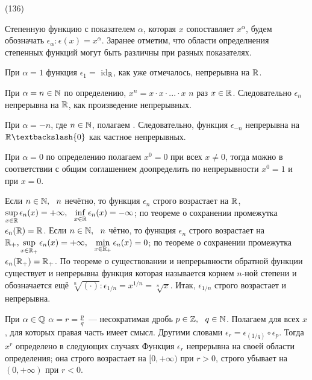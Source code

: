(136)

Степенную функцию с показателем $\alpha$, которая $x$ сопоставляет $x^\alpha$, будем обозначать $\epsilon_\alpha: \epsilon(x) = x^\alpha$. Заранее отметим, что области определнения степенных функций могут быть различны при разных показателях.

При $\alpha = 1$ функция $\epsilon_1 =$ id$_{\mathbb{R}}$, как уже отмечалось, непрерывна на $\mathbb{R}$.

При $\alpha = n\in\mathbb{N}$ по определению, $x^n = x\cdot x\cdot ... \cdot x$ $n$ раз $x \in \mathbb{R}$. Следовательно $\epsilon_n$непрерывна на $\mathbb{R}$, как произведение непрерывных.

При $\alpha = -n$, где $n \in \mathbb{N}$, полагаем . Следовательно, функция $\epsilon_{-n}$ непрерывна на $\R\bsl \{0\}$ как частное непрерывных.

При $\alpha = 0$ по определению полагаем $x^0 = 0$ при всех $x \neq 0$, тогда можно в соответствии с общим соглашением доопределить  по непрерывности $x^0 = 1$ и при $x = 0$.

Если $n \in \mathbb{N},\ \  n$ нечётно, то функция $\epsilon_n$ строго возрастает на $\mathbb{R}$, $\displaystyle \sup\limits^{}_{x \in \mathbb{R}} \epsilon_n(x) = +\infty,\ \  \displaystyle \inf\limits^{}_{x \in \mathbb{R}} \epsilon_n(x) = -\infty$; по теореме о сохранении промежутка $\epsilon_n(\mathbb{R}) = \mathbb{R}$. Если $n \in \mathbb{N},\ \  n$ чётно, то функция $\epsilon_n$ строго возрастает на $\mathbb{R}_+, \displaystyle \sup\limits^{}_{x\in \mathbb{R}_+} \epsilon_n(x) = +\infty,\ \  \displaystyle \min\limits^{}_{x \in \mathbb{R}_+} \epsilon_n(x) = 0$; по теореме о сохранении промежутка $\epsilon_n(\mathbb{R}_+) = \mathbb{R}_+$. По теореме о существовании и непрерывности обратной функции существует и непрерывна функция  которая называется корнем $n$-ной степени и обозначается ещё $\sqrt[n]{(\cdot)}: \epsilon_{1/n} = x^{1/n} = \sqrt[n]{x}$. Итак,   $\epsilon_{1/n}$ строго возрастает и непрерывна.

При $\alpha \in \mathbb{Q}$ $\alpha = r = \frac pq$~--- несократимая дробь $p \in \mathbb{Z},\ \  q \in \mathbb{N}$. Полагаем  для всех $x$, для которых правая часть имеет смысл. Другими словами $\epsilon_r = \epsilon_(1/q) \circ \epsilon_p$. Тогда $x^r$ определено в следующих случаях    Функция $\epsilon_r$ непрерывна на своей области определения; она строго возрастает на $[0, +\infty)$ при $r > 0$, строго убывает на $(0, +\infty)$ при $r < 0$.

